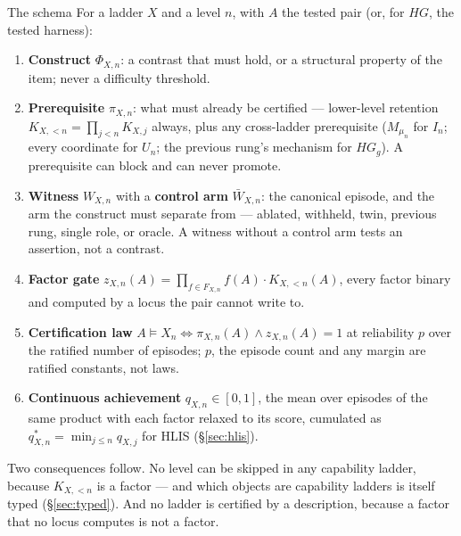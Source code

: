 \documentclass[11pt]{article}
\theoremstyle{definition}
\begin{document}
\begin{claimbox}{The schema}
For a ladder $X$ and a level $n$, with $A$ the tested pair (or, for $HG$, the tested harness):
\begin{enumerate}[leftmargin=*,itemsep=1pt]
\item \textbf{Construct} $\Phi_{X,n}$: a contrast that must hold, or a structural property of the item; never a difficulty threshold.
\item \textbf{Prerequisite} $\pi_{X,n}$: what must already be certified --- lower-level retention $K_{X,<n} = \prod_{j<n} K_{X,j}$ always, plus any cross-ladder prerequisite ($M_{\mu_n}$ for $I_n$; every coordinate for $U_n$; the previous rung's mechanism for $HG_g$). A prerequisite can block and can never promote.
\item \textbf{Witness} $W_{X,n}$ with a \textbf{control arm} $\bar W_{X,n}$: the canonical episode, and the arm the construct must separate from --- ablated, withheld, twin, previous rung, single role, or oracle. A witness without a control arm tests an assertion, not a contrast.
\item \textbf{Factor gate} $z_{X,n}(A) = \prod_{f \in F_{X,n}} f(A) \cdot K_{X,<n}(A)$, every factor binary and computed by a locus the pair cannot write to.
\item \textbf{Certification law} $A \models X_n \iff \pi_{X,n}(A) \wedge z_{X,n}(A) = 1$ at reliability $p$ over the ratified number of episodes; $p$, the episode count and any margin are ratified constants, not laws.
\item \textbf{Continuous achievement} $q_{X,n} \in [0,1]$, the mean over episodes of the same product with each factor relaxed to its score, cumulated as $q^{*}_{X,n} = \min_{j \le n} q_{X,j}$ for HLIS (\S\ref{sec:hlis}).
\end{enumerate}
Two consequences follow. No level can be skipped in any capability ladder, because $K_{X,<n}$ is a factor --- and which objects are capability ladders is itself typed (\S\ref{sec:typed}). And no ladder is certified by a description, because a factor that no locus computes is not a factor.
\end{claimbox}
\end{document}
